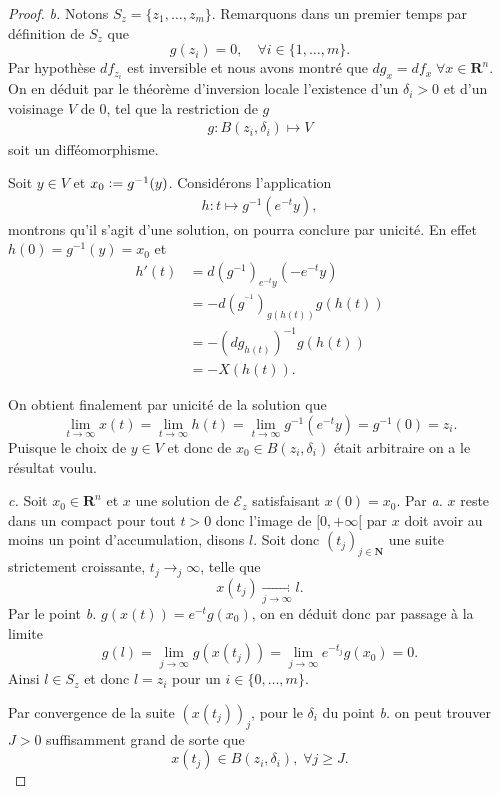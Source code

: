 \documentclass[12pt]{article}
\newcommand{\defeq}{\vcentcolon=}
\newcommand{\R}{\mathbf{R}}
\newcommand{\N}{\mathbf{N}}
\begin{document}
\begin{proof}
\medskip

\textit{b.} Notons $S_{z} = \{z_1, \ldots, z_{m}\}$. Remarquons dans un premier temps par définition de $S_{z}$ que \[
        g(z_{i}) = 0, \quad \forall i \in \{1, \ldots, m\} 
.\] Par hypothèse $df_{z_{i}}$ est inversible et nous avons montré que $dg_{x} = df_{x} \; \forall x \in \R^{n}$. On en déduit par le théorème d'inversion locale l'existence d'un $\delta_{i} > 0$ et d'un voisinage $V$ de 0, tel que la restriction de $g$
\begin{align*}
        g : B(z_{i}, \delta_{i}) \longmapsto V
\end{align*} soit un difféomorphisme.

Soit $y \in V$ et $x_0 \defeq g^{-1}(y)$. Considérons l'application
\begin{align*}
        h : t \longmapsto g^{-1}(e^{-t}y)
,\end{align*} montrons qu'il s'agit d'une solution, on pourra conclure par unicité.
En effet $h(0) = g^{-1}(y) = x_0$ et
\begin{align*}
        h'(t) &= d(g^{-1})_{e^{-t}y}(-e^{-t}y) \\
              &= -d(g^{^{-1}})_{g(h(t))}g(h(t)) \\
              &= -(dg_{h(t)})^{-1}g(h(t)) \\
              &= -X(h(t))
.\end{align*}

On obtient finalement par unicité de la solution que \[
        \lim_{t\to \infty}x(t) = \lim_{t\to \infty}h(t) = \lim_{t\to \infty}g^{-1}(e^{-t}y) = g^{-1}(0) = z_{i}
.\] Puisque le choix de $y \in V$ et donc de $x_0 \in B(z_{i}, \delta_{i})$ était arbitraire on a le résultat voulu. 

\medskip

\textit{c.} Soit $x_0 \in \R^{n}$ et $x$ une solution de $\mathcal{E}_{z}$ satisfaisant $x(0) = x_0$. Par \textit{a.} $x$ reste dans un compact pour tout $t > 0$ donc l'image de $[0, +\infty[$ par $x$ doit avoir au moins un point d'accumulation, disons $l$. Soit donc $(t_{j})_{j\in\N}$ une suite strictement croissante, $t_{j} \to_{j} \infty$, telle que \[
        x(t_{j}) \underset{j\to \infty}{\longrightarrow} l
.\] 
Par le point \textit{b.} $g(x(t)) = e^{-t}g(x_0)$, on en déduit donc par passage à la limite \[
        g(l) = \lim_{j\to \infty}g(x(t_{j})) = \lim_{j\to \infty}e^{-t_{j}}g(x_0) = 0
.\] Ainsi $l \in S_{z}$ et donc $l = z_{i}$ pour un $i \in \{0, \ldots, m\}$.

Par convergence de la suite $(x(t_{j}))_{j}$, pour le $\delta_{i}$ du point \textit{b.} on peut trouver $J > 0$ suffisamment grand de sorte que \[
x(t_{j}) \in B(z_{i}, \delta_{i}), \; \forall j \ge J
.\]


\end{proof}
\end{document}
